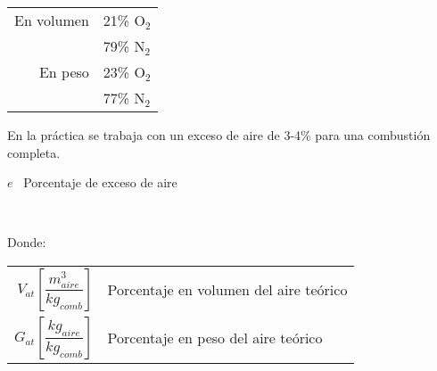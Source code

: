 \documentclass[11pt,a4paper]{article}
\newcommand{\vs}{\vspace{-.3cm}}
\begin{document}
	\begin{cajita}
			
		\begin{center}
		\end{center}
	
		\begin{multicols}{2}
			
			\begin{tabular}{r l}
				En volumen & 21\% O$_2$\\
				& 79\% N$_2$\\
				En peso    & 23\% O$_2$\\
				& 77\% N$_2$\\
			\end{tabular}
		
			
			
			
			\vs
			
			\begin{flushleft}
				En la práctica se trabaja con un exceso de aire de 3-4\%  para una combustión completa.
			\end{flushleft}
		
			
			\begin{flushleft}
				$e$ \, Porcentaje de exceso de aire
			\end{flushleft}
		
			\columnbreak
			
			
			\\ \vspace{.3cm}
			
		
			\begin{flushleft}
				Donde: \vspace{.5cm}
				
				\begin{tabular}{r p{.5\linewidth}}
					 $V_{at} \left[\dfrac{m^3_{aire}}{kg_{comb}}\right]$ & Porcentaje en volumen del aire teórico \\
					 $G_{at} \left[\dfrac{kg_{aire}}{kg_{comb}}\right]$ & Porcentaje en peso del aire teórico
				\end{tabular}
			\end{flushleft}
			
		\end{multicols}
		
	\end{cajita}
\end{document}
